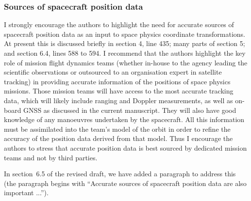\documentclass[11pt]{article}
\begin{document}
\subsubsection{Sources of spacecraft position data}
I strongly encourage the authors to highlight the need for accurate sources of spacecraft position data as an
input to space physics coordinate transformations. At present this is discussed briefly in section 4, line 435;
many parts of section 5; and section 6.4, lines 588 to 594. I recommend that the authors highlight the key
role of mission flight dynamics teams (whether in-house to the agency leading the scientific observations or
outsourced to an organisation expert in satellite tracking) in providing accurate information of the positions
of space physics missions. Those mission teams will have access to the most accurate tracking data, which
will likely include ranging and Doppler measurements, as well as on-board GNSS as discussed in the current
manuscript. They will also have good knowledge of any manoeuvres undertaken by the spacecraft. All this
information must be assimilated into the team’s model of the orbit in order to refine the accuracy of the
position data derived from that model. Thus I encourage the authors to stress that accurate position data is
best sourced by dedicated mission teams and not by third parties.
\\
{\color{violet}
\begin{leftbar}
In section~6.5 of the revised draft, we have added a paragraph to address this (the paragraph begins with ``Accurate sources of spacecraft position data are also important ...'').
\end{leftbar}
}
\end{document}
